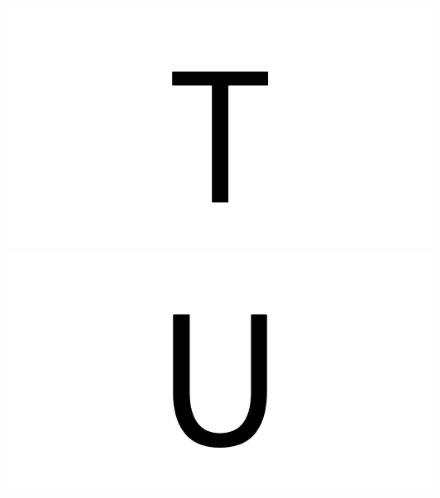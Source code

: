 \documentclass{article}
\begin{document}
\begin{figure}[H]
  \includegraphics[width=\linewidth]{u_T}
\endminipage\hfill
{}
  \includegraphics[width=\linewidth]{u_U}
\endminipage\hfill
\end{figure}

\clearpage
\end{document}
